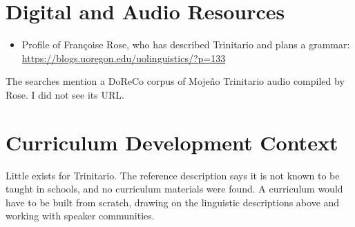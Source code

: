 \documentclass[12pt]{article}
\begin{document}
\section{Digital and Audio Resources}
\begin{itemize}
\item Profile of Fran\c{c}oise Rose, who has described Trinitario and plans a grammar: \url{https://blogs.uoregon.edu/uolinguistics/?p=133}
\end{itemize}
The searches mention a DoReCo corpus of Mojeño Trinitario audio compiled by Rose. I did not see its URL.

\section{Curriculum Development Context}
Little exists for Trinitario. The reference description says it is not known to be taught in schools, and no curriculum materials were found. A curriculum would have to be built from scratch, drawing on the linguistic descriptions above and working with speaker communities.
\end{document}
